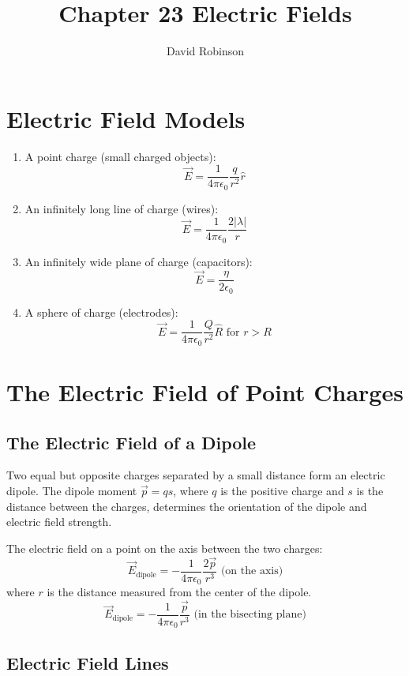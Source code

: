 \documentclass{article}
\title{Chapter 23 Electric Fields}
\author{David Robinson}
\date{}
\begin{document}
\maketitle

\section*{Electric Field Models}

\begin{enumerate}
    \item A point charge (small charged objects):
    \[\vec{E}=\frac{1}{4\pi\epsilon_0}\frac{q}{r^2}\hat{r}\]
    \item An infinitely long line of charge (wires):
    \[\vec{E}=\frac{1}{4\pi\epsilon_0}\frac{2|\lambda |}{r}\]
    \item An infinitely wide plane of charge (capacitors):
    \[\vec{E}=\frac{\eta}{2\epsilon_0}\]
    \item A sphere of charge (electrodes):
    \[\vec{E}=\frac{1}{4\pi\epsilon_0}\frac{Q}{r^2}\hat{R}\text{ for }r > R\]
\end{enumerate}

\section*{The Electric Field of Point Charges}

\subsection*{The Electric Field of a Dipole}

Two equal but opposite charges separated by a small distance form an electric dipole. The dipole moment $\vec{p}=qs$, where $q$ is the positive charge and $s$ is the distance between the charges, determines the orientation of the dipole and electric field strength. \newline

The electric field on a point on the axis between the two charges:
\[\vec{E}_{\text{dipole}}=-\frac{1}{4\pi\epsilon_0}\frac{2\vec{p}}{r^3} \text{ (on the axis)}\]
where $r$ is the distance measured from the center of the dipole.
\[\vec{E}_{\text{dipole}}=-\frac{1}{4\pi\epsilon_0}\frac{\vec{p}}{r^3} \text{ (in the bisecting plane)}\]

\subsection*{Electric Field Lines}
\end{document}
